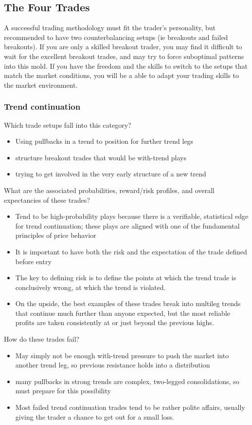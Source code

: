 \documentclass{../notes}
\begin{document}
\subsection{The Four Trades}
A successful trading methodology must fit the trader's personality, but recommended to have two counterbalancing setups (ie breakouts and failed breakouts). If you are only a skilled breakout trader, you may find it difficult to wait for the excellent breakout trades, and may try to force suboptimal patterns into this mold. If you have the freedom and the skills to switch to the setups that match the market conditions, you will be a able to adapt your trading skills to the market environment.
\subsubsection{Trend continuation}
Which trade setups fall into this category?
\begin{itemize}
  \item Using pullbacks in a trend to position for further trend legs
  \item structure breakout trades that would be with-trend plays
  \item trying to get involved in the very early structure of a new trend
\end{itemize}
What are the associated probabilities, reward/risk profiles, and overall expectancies of these trades?
\begin{itemize}
  \item Tend to be high-probability plays because there is a verifiable, statistical edge for trend continuation; these plays are aligned with one of the fundamental principles of price behavior
  \item It is important to have both the risk and the expectation of the trade defined before entry
  \item The key to defining risk is to define the points at which the trend trade is conclusively wrong, at which the trend is violated.
  \item On the upside, the best examples of these trades break into multileg trends that continue much further than anyone expected, but the most reliable profits are taken consistently at or just beyond the previous highs.
\end{itemize}
How do these trades fail?
\begin{itemize}
  \item May simply not be enough with-trend pressure to push the market into another trend leg, so previous resistance holds into a distribution
  \item many pullbacks in strong trends are complex, two-legged consolidations, so must prepare for this possibility
  \item Most failed trend continuation trades tend to be rather polite affairs, usually giving the trader a chance to get out for a small loss.
\end{itemize}
\end{document}
